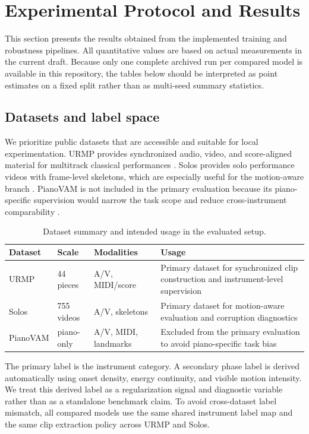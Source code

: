 \section{Experimental Protocol and Results}
\label{sec:experiments}

This section presents the results obtained from the implemented training and robustness pipelines. All quantitative values are based on actual measurements in the current draft. Because only one complete archived run per compared model is available in this repository, the tables below should be interpreted as point estimates on a fixed split rather than as multi-seed summary statistics.

\subsection{Datasets and label space}

We prioritize public datasets that are accessible and suitable for local experimentation. URMP provides synchronized audio, video, and score-aligned material for multitrack classical performances \citep{Li2019URMP}. Solos provides solo performance videos with frame-level skeletons, which are especially useful for the motion-aware branch \citep{Montesinos2020Solos}. PianoVAM is not included in the primary evaluation because its piano-specific supervision would narrow the task scope and reduce cross-instrument comparability \citep{Kim2025PianoVAM}.

\begin{table}[ht]
\centering
\caption{Dataset summary and intended usage in the evaluated setup.}
\label{tab:datasets}
\begin{tabular}{p{2.2cm}p{1.8cm}p{3.1cm}p{4.8cm}}
\toprule
Dataset & Scale & Modalities & Usage \\
\midrule
URMP & 44 pieces & A/V, MIDI/score & Primary dataset for synchronized clip construction and instrument-level supervision \\
Solos & 755 videos & A/V, skeletons & Primary dataset for motion-aware evaluation and corruption diagnostics \\
PianoVAM & piano-only & A/V, MIDI, landmarks & Excluded from the primary evaluation to avoid piano-specific task bias \\
\bottomrule
\end{tabular}
\end{table}

The primary label is the instrument category. A secondary phase label is derived automatically using onset density, energy continuity, and visible motion intensity. We treat this derived label as a regularization signal and diagnostic variable rather than as a standalone benchmark claim. To avoid cross-dataset label mismatch, all compared models use the same shared instrument label map and the same clip extraction policy across URMP and Solos.

